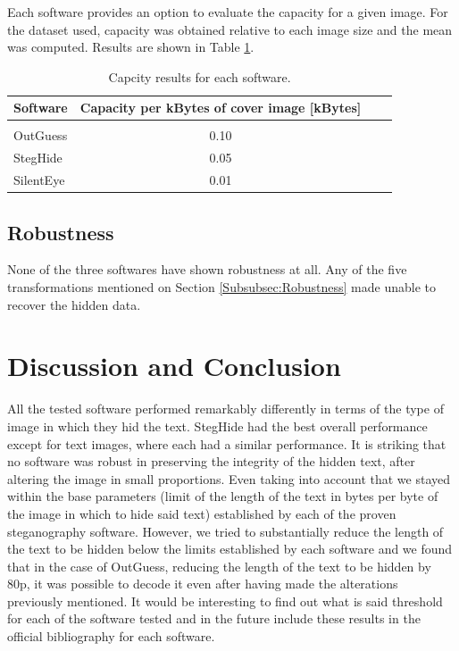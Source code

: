 \documentclass[11pt]{article}
\begin{document}
Each software provides an option to evaluate the capacity for a given image. For the dataset used, capacity was obtained
relative to each image size and the mean was computed. Results are shown in Table \ref{Tab:Capacity}.


\begin{table}[!h] 
\caption{Capcity results for each software.}
\label{Tab:Capacity}
\begin{tabular}{lclc}
\hline
\hline 
Software &  Capacity per kBytes of cover image [kBytes] \\
\hline
\midrule
{}       &   \\
OutGuess  &  0.10  \\
StegHide  &  0.05 \\
SilentEye   &  0.01 \\
\hline
\end{tabular}
\end{table}


\subsection{Robustness}

None of the three softwares have shown robustness at all. Any of the five transformations mentioned on Section 
\ref{Subsubsec:Robustness} made unable to recover the hidden data.

\section{Discussion and Conclusion}
All the tested software performed remarkably differently in terms of the type of image in which they hid the text. StegHide had 
the best overall performance except for text images, where each had a similar performance.
It is striking that no software was robust in preserving the integrity of the hidden text, after altering the image in small 
proportions.
Even taking into account that we stayed within the base parameters (limit of the length of the text in bytes per byte of the 
image in which to hide said text) established by each of the proven steganography software.
However, we tried to substantially reduce the length of the text to be hidden below the limits established by each software and 
we found that in the case of OutGuess, reducing the length of the text to be hidden by 80p, it was possible to decode it even 
after having made the alterations previously mentioned.
It would be interesting to find out what is said threshold for each of the software tested and in the future include these 
results in the official bibliography for each software.
\end{document}

